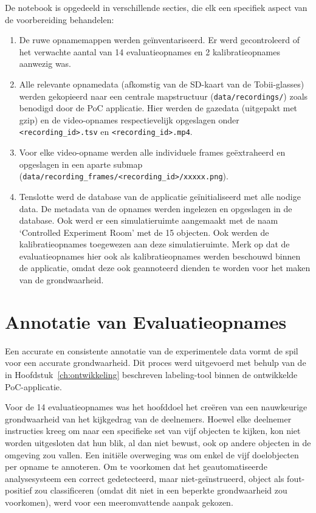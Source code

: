 De notebook is opgedeeld in verschillende secties, die elk een specifiek aspect van de voorbereiding behandelen:
\begin{enumerate}
    \item De ruwe opnamemappen werden geïnventariseerd. Er werd gecontroleerd of het verwachte aantal van 14 evaluatieopnames 
    en 2 kalibratieopnames aanwezig was.
    \item Alle relevante opnamedata (afkomstig van de SD-kaart van de Tobii-glasses) werden gekopieerd naar een centrale 
    mapstructuur (\texttt{data/recordings/}) zoals benodigd door de PoC applicatie.
    Hier werden de gazedata (uitgepakt met gzip) en de video-opnames respectievelijk opgeslagen onder\\ \texttt{<recording\_id>.tsv} 
    en \texttt{<recording\_id>.mp4}.
    \item Voor elke video-opname werden alle individuele frames geëxtraheerd en opgeslagen 
    in een aparte submap\\ (\texttt{data/recording\_frames/<recording\_id>/xxxxx.png}).
    \item Tenslotte werd de database van de applicatie geïnitialiseerd met alle nodige data. De metadata van de opnames werden 
    ingelezen en opgeslagen in de database.
    Ook werd er een simulatieruimte aangemaakt met de naam `Controlled Experiment Room' met de 15 objecten. Ook werden de kalibratieopnames toegewezen aan deze simulatieruimte.
    Merk op dat de evaluatieopnames hier ook als kalibratieopnames werden beschouwd binnen de applicatie, omdat deze ook geannoteerd 
    dienden te worden voor het maken van de grondwaarheid.
\end{enumerate}

\section{Annotatie van Evaluatieopnames}

Een accurate en consistente annotatie van de experimentele data vormt de spil voor een accurate grondwaarheid.
Dit proces werd uitgevoerd met behulp van de in Hoofdstuk~\ref{ch:ontwikkeling} beschreven labeling-tool binnen de ontwikkelde PoC-applicatie. 

Voor de 14 evaluatieopnames was het hoofddoel het creëren van een nauwkeurige grondwaarheid van het kijkgedrag van de deelnemers. 
Hoewel elke deelnemer instructies kreeg om naar een specifieke set van vijf objecten te kijken, kon niet worden uitgesloten dat hun blik, 
al dan niet bewust, ook op andere objecten in de omgeving zou vallen. 
Een initiële overweging was om enkel de vijf doelobjecten per opname te annoteren. 
Om te voorkomen dat het geautomatiseerde analysesysteem een correct gedetecteerd, maar niet-geïnstrueerd, 
object als fout-positief zou classificeren (omdat dit niet in een beperkte grondwaarheid zou voorkomen), 
werd voor een meeromvattende aanpak gekozen.

